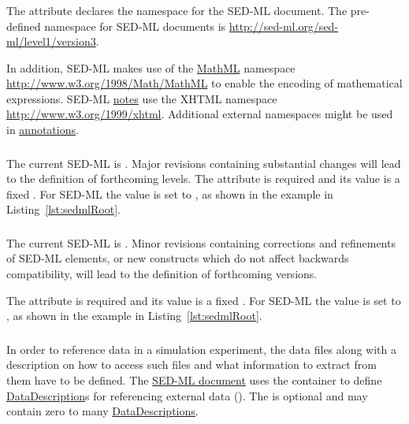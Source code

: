 \subsubsection{}
\label{sec:xmlns}
The  attribute declares the namespace for the SED-ML document. The pre-defined namespace for SED-ML documents is \url{http://sed-ml.org/sed-ml/level1/version3}. 

In addition, SED-ML makes use of the \hyperref[sec:mathML]{MathML} namespace \url{http://www.w3.org/1998/Math/MathML} to enable the encoding of mathematical expressions. SED-ML \hyperref[class:notes]{notes} use the XHTML namespace \url{http://www.w3.org/1999/xhtml}. Additional external namespaces might be used in \hyperref[class:annotation]{annotations}.

\subsubsection{}
\label{sec:level}
The current SED-ML  is \code{\level}. Major revisions containing substantial changes will lead to the definition of forthcoming levels. The  attribute is required and its value is a fixed . For SED-ML \currentLV the value is set to \code{\level}, as shown in the example in Listing~\ref{lst:sedmlRoot}.

\subsubsection{}
\label{sec:version}
The current SED-ML  is \code{\version}. Minor revisions containing corrections and refinements of SED-ML elements, or new constructs which do not affect backwards compatibility, will lead to the definition of forthcoming versions.

The  attribute is required and its value is a fixed . For SED-ML \currentLV the value is set to \code{\version}, as shown in the example in Listing~\ref{lst:sedmlRoot}.

\subsubsection{}
\label{sec:listOfDataDescriptions}
In order to reference data in a simulation experiment, the data files along with a description on how to access such files and what information to extract from them have to be defined. The \hyperref[class:sed-ml]{SED-ML document} uses the  container to define \hyperref[class:dataDescription]{DataDescription}s for referencing external data (). The  is optional and may contain zero to many \hyperref[class:dataDescription]{DataDescriptions}.

